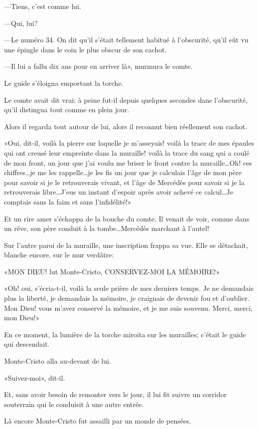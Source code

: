 —Tiens, c'est comme lui. 

—Qui, lui? 

—Le numéro 34. On dit qu'il s'était tellement habitué à l'obscurité, qu'il eût vu une épingle dans le coin le plus obscur de son cachot. 

—Il lui a fallu dix ans pour en arriver là», murmura le comte. 

Le guide s'éloigna emportant la torche. 

Le comte avait dit vrai: à peine fut-il depuis quelques secondes dans l'obscurité, qu'il distingua tout comme en plein jour. 

Alors il regarda tout autour de lui, alors il reconnut bien réellement son cachot. 

«Oui, dit-il, voilà la pierre sur laquelle je m'asseyais! voilà la trace de mes épaules qui ont creusé leur empreinte dans la muraille! voilà la trace du sang qui a coulé de mon front, un jour que j'ai voulu me briser le front contre la muraille\dots Oh! ces chiffres\dots je me les rappelle\dots je les fis un jour que je calculais l'âge de mon père pour savoir si je le retrouverais vivant, et l'âge de Mercédès pour savoir si je la retrouverais libre\dots J'eus un instant d'espoir après avoir achevé ce calcul\dots Je comptais sans la faim et sans l'infidélité!» 

Et un rire amer s'échappa de la bouche du comte. Il venait de voir, comme dans un rêve, son père conduit à la tombe\dots Mercédès marchant à l'autel! 

Sur l'autre paroi de la muraille, une inscription frappa sa vue. Elle se détachait, blanche encore, sur le mur verdâtre: 

«MON DIEU! lut Monte-Cristo, CONSERVEZ-MOI LA MÉMOIRE!» 

«Oh! oui, s'écria-t-il, voilà la seule prière de mes derniers temps. Je ne demandais plus la liberté, je demandais la mémoire, je craignais de devenir fou et d'oublier. Mon Dieu! vous m'avez conservé la mémoire, et je me suis souvenu. Merci, merci, mon Dieu!» 

En ce moment, la lumière de la torche miroita sur les murailles; c'était le guide qui descendait. 

Monte-Cristo alla au-devant de lui. 

«Suivez-moi», dit-il. 

Et, sans avoir besoin de remonter vers le jour, il lui fit suivre un corridor souterrain qui le conduisit à une autre entrée. 

Là encore Monte-Cristo fut assailli par un monde de pensées. 

